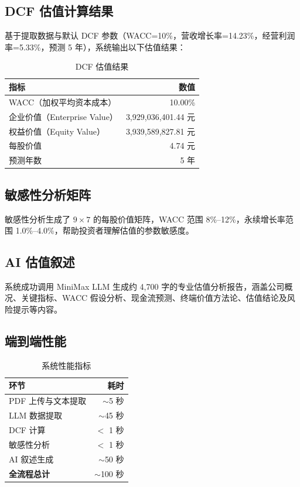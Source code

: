 \documentclass[12pt,a4paper]{article}
\begin{document}
\subsection{DCF 估值计算结果}

基于提取数据与默认 DCF 参数（WACC=10\%，营收增长率=14.23\%，经营利润率=5.33\%，预测 5 年），系统输出以下估值结果：

\begin{table}[H]
\centering
\caption{DCF 估值结果}
\begin{tabular}{@{}lr@{}}
\toprule
\textbf{指标} & \textbf{数值} \\
\midrule
WACC（加权平均资本成本）     & 10.00\% \\
企业价值（Enterprise Value） & 3,929,036,401.44 元 \\
权益价值（Equity Value）     & 3,939,589,827.81 元 \\
每股价值                      & 4.74 元 \\
预测年数                      & 5 年 \\
\bottomrule
\end{tabular}
\end{table}

\subsection{敏感性分析矩阵}

敏感性分析生成了 $9 \times 7$ 的每股价值矩阵，WACC 范围 8\%--12\%，永续增长率范围 1.0\%--4.0\%，帮助投资者理解估值的参数敏感度。

\subsection{AI 估值叙述}

系统成功调用 MiniMax LLM 生成约 4,700 字的专业估值分析报告，涵盖公司概况、关键指标、WACC 假设分析、现金流预测、终端价值方法论、估值结论及风险提示等内容。

\subsection{端到端性能}

\begin{table}[H]
\centering
\caption{系统性能指标}
\begin{tabular}{@{}lr@{}}
\toprule
\textbf{环节} & \textbf{耗时} \\
\midrule
PDF 上传与文本提取  & $\sim$5 秒 \\
LLM 数据提取       & $\sim$45 秒 \\
DCF 计算           & $<$ 1 秒 \\
敏感性分析         & $<$ 1 秒 \\
AI 叙述生成        & $\sim$50 秒 \\
\midrule
\textbf{全流程总计} & $\sim$100 秒 \\
\bottomrule
\end{tabular}
\end{table}
\end{document}
